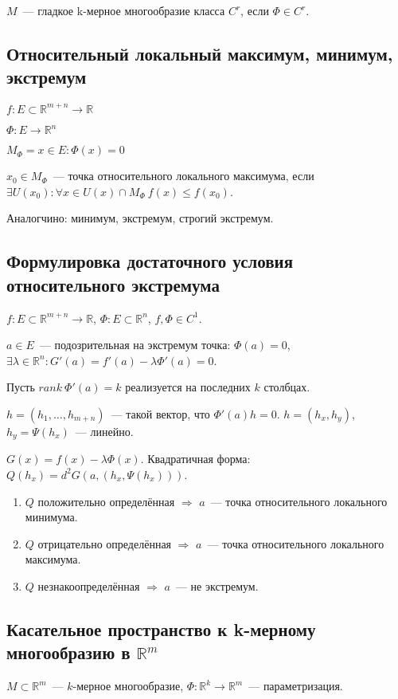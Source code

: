 \documentclass[paper=a4, fontsize=11pt]{article}
\begin{document}
$M$~--- гладкое k-мерное многообразие класса $C^r$, если $\Phi \in C^r$.

\subsection{Относительный локальный максимум, минимум, экстремум}
$f: E \subset \mathds{R}^{m+n} \rightarrow \mathds{R}$

$\Phi: E \rightarrow \mathds{R}^n$

$M_\Phi = {x \in E: \Phi(x) = 0}$

$x_0 \in M_\Phi$~--- точка относительного локального максимума, если $\exists U(x_0): \forall x \in U(x) \cap M_\Phi\ f(x) \leq f(x_0)$.

Аналогчино: минимум, экстремум, строгий экстремум.

\subsection{Формулировка достаточного условия относительного экстремума}
$f: E \subset \mathds{R}^{m+n} \rightarrow \mathds{R}$, $\Phi: E \subset \mathds{R}^n$, $f, \Phi \in C^1$.

$a \in E$~--- подозрительная на экстремум точка: $\Phi(a) = 0$, $\exists \lambda \in \mathds{R}^n: G'(a) = f'(a) - \lambda\Phi'(a) = 0$.

Пусть $rank\ \Phi'(a)=k$ реализуется на последних $k$ столбцах.

$h = (h_1,\dots,h_{m+n})$~--- такой вектор, что $\Phi'(a)h = 0$. $h = (h_x,h_y)$, $h_y = \Psi(h_x)$~--- линейно.

$G(x) = f(x) - \lambda\Phi(x)$. Квадратичная форма: $Q(h_x) = d^2G(a,(h_x,\Psi(h_x)))$.
\begin{enumerate}
    \item $Q$ положительно определённая $\Rightarrow$ $a$~--- точка относительного локального минимума.
    \item $Q$ отрицательно определённая $\Rightarrow$ $a$~--- точка относительного локального максимума.
    \item $Q$ незнакоопределённая $\Rightarrow$ $a$~--- не экстремум.
\end{enumerate}
\subsection{Касательное пространство к k-мерному многообразию в $\mathds{R}^m$}
$M \subset \mathds{R}^m$~--- $k$-мерное многообразие, $\Phi: \mathds{R}^k \rightarrow \mathds{R}^m$~--- параметризация.
\end{document}
